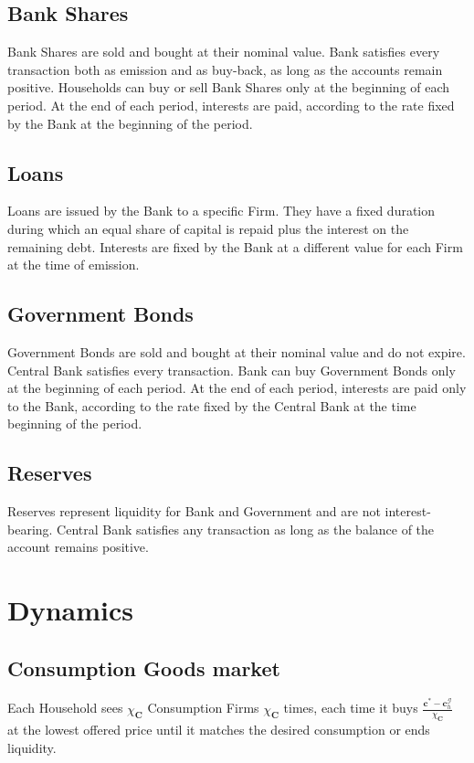 \documentclass[a4paper, headings=standardclasses]{scrartcl}
\begin{document}
\subsection{Bank Shares}
Bank Shares are sold and bought at their nominal value. Bank satisfies every transaction both as emission and as buy-back, as long as the accounts remain positive. Households can buy or sell Bank Shares only at the beginning of each period. At the end of each period, interests are paid, according to the rate fixed by the Bank at the beginning of the period.

\subsection{Loans}
Loans are issued by the Bank to a specific Firm. They have a fixed duration during which an equal share of capital is repaid plus the interest on the remaining debt. Interests are fixed by the Bank at a different value for each Firm at the time of emission.

\subsection{Government Bonds}
Government Bonds are sold and bought at their nominal value and do not expire. Central Bank satisfies every transaction. Bank can buy Government Bonds only at the beginning of each period. At the end of each period, interests are paid only to the Bank, according to the rate fixed by the Central Bank at the time beginning of the period.

\subsection{Reserves}
Reserves represent liquidity for Bank and Government and are not interest-bearing. Central Bank satisfies any transaction as long as the balance of the account remains positive.

\section{Dynamics}
\subsection{Consumption Goods market}
Each Household sees $\chi_\mathbf{C}$ Consumption Firms $\chi_\mathbf{C}$ times, each time it buys $\frac{\mathbf{c}^* - \mathbf{c}^\mathcal{G}_h}{\chi_\mathbf{C}}$ at the lowest offered price until it matches the desired consumption or ends liquidity.
\end{document}
